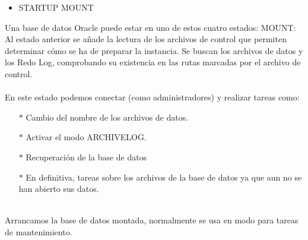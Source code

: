 \begin{itemize}
	\item STARTUP MOUNT 
\end{itemize}
\begin{adjustwidth}{0.40in}{0.0in}
	Una base de datos Oracle puede estar en uno de estos cuatro estados:
	MOUNT: Al estado anterior se añade la lectura de los archivos de control que permiten determinar cómo se ha de preparar la instancia. Se buscan los archivos de datos y los Redo Log, comprobando su existencia en las rutas marcadas por el archivo de control.\\ \\
	En este estado podemos conectar (como administradores) y realizar tareas como:
	\begin{itemize}
		\item[$*$] Cambio del nombre de los archivos de datos.
		\item[$*$] Activar el modo ARCHIVELOG.
		\item[$*$] Recuperación de la base de datos
		\item[$*$] En definitiva, tareas sobre los archivos de la base de datos ya que aun no se han abierto sus datos.	\\
\\
	\end{itemize}
	Arrancamos la base de datos montada, normalmente se usa en modo para tareas de mantenimiento.	
\end{adjustwidth}




	
	

\vspace{\baselineskip}
\vspace{\baselineskip}
